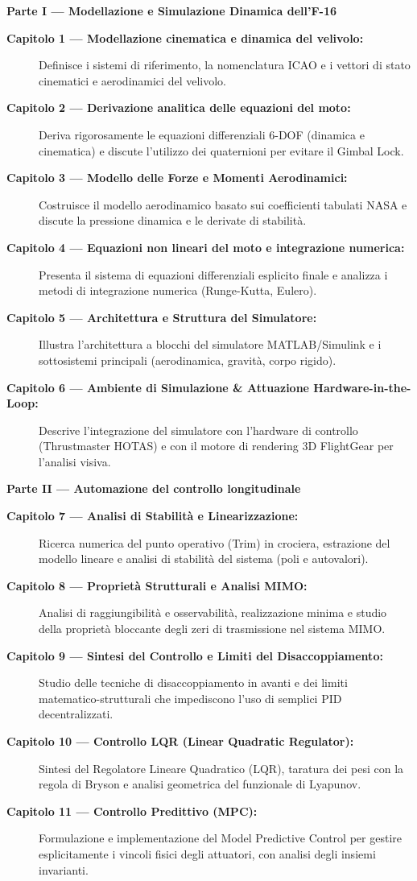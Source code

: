 \noindent\textbf{Parte I — Modellazione e Simulazione Dinamica dell'F-16}
\begin{description}
	\item[\textbf{Capitolo 1 — Modellazione cinematica e dinamica del velivolo:}]
	Definisce i sistemi di riferimento, la nomenclatura ICAO e i vettori di stato cinematici e aerodinamici del velivolo.
	\item[\textbf{Capitolo 2 — Derivazione analitica delle equazioni del moto:}]
	Deriva rigorosamente le equazioni differenziali 6-DOF (dinamica e cinematica) e discute l'utilizzo dei quaternioni per evitare il Gimbal Lock.
	\item[\textbf{Capitolo 3 — Modello delle Forze e Momenti Aerodinamici:}]
	Costruisce il modello aerodinamico basato sui coefficienti tabulati NASA e discute la pressione dinamica e le derivate di stabilità.
	\item[\textbf{Capitolo 4 — Equazioni non lineari del moto e integrazione numerica:}]
	Presenta il sistema di equazioni differenziali esplicito finale e analizza i metodi di integrazione numerica (Runge-Kutta, Eulero).
	\item[\textbf{Capitolo 5 — Architettura e Struttura del Simulatore:}]
	Illustra l'architettura a blocchi del simulatore MATLAB/Simulink e i sottosistemi principali (aerodinamica, gravità, corpo rigido).
	\item[\textbf{Capitolo 6 — Ambiente di Simulazione \& Attuazione Hardware-in-the-Loop:}]
	Descrive l'integrazione del simulatore con l'hardware di controllo (Thrustmaster HOTAS) e con il motore di rendering 3D FlightGear per l'analisi visiva.
\end{description}

\noindent\textbf{Parte II — Automazione del controllo longitudinale }
\begin{description}
	\item[\textbf{Capitolo 7 — Analisi di Stabilità e Linearizzazione:}]
	Ricerca numerica del punto operativo (Trim) in crociera, estrazione del modello lineare e analisi di stabilità del sistema (poli e autovalori).
	\item[\textbf{Capitolo 8 — Proprietà Strutturali e Analisi MIMO:}]
	Analisi di raggiungibilità e osservabilità, realizzazione minima e studio della proprietà bloccante degli zeri di trasmissione nel sistema MIMO.
	\item[\textbf{Capitolo 9 — Sintesi del Controllo e Limiti del Disaccoppiamento:}]
	Studio delle tecniche di disaccoppiamento in avanti e dei limiti matematico-strutturali che impediscono l'uso di semplici PID decentralizzati.
	\item[\textbf{Capitolo 10 — Controllo LQR (Linear Quadratic Regulator):}]
	Sintesi del Regolatore Lineare Quadratico (LQR), taratura dei pesi con la regola di Bryson e analisi geometrica del funzionale di Lyapunov.
	\item[\textbf{Capitolo 11 — Controllo Predittivo (MPC):}]
	Formulazione e implementazione del Model Predictive Control per gestire esplicitamente i vincoli fisici degli attuatori, con analisi degli insiemi invarianti.
\end{description}

